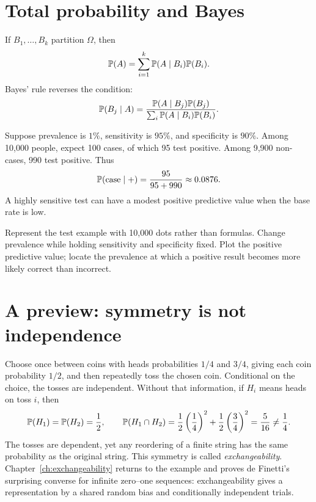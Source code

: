 \section{Total probability and Bayes}

If $B_1,\ldots,B_k$ partition $\Omega$, then
\[
\P(A)=\sum_{i=1}^k \P(A\mid B_i)\P(B_i).
\]
Bayes' rule reverses the condition:
\[
\P(B_j\mid A)=
\frac{\P(A\mid B_j)\P(B_j)}{\sum_i \P(A\mid B_i)\P(B_i)}.
\]

\begin{example}
Suppose prevalence is $1\%$, sensitivity is $95\%$, and specificity is $90\%$. Among 10,000 people, expect 100 cases, of which 95 test positive. Among 9,900 non-cases, 990 test positive. Thus
\[
\P(\text{case}\mid +)=\frac{95}{95+990}\approx 0.0876.
\]
A highly sensitive test can have a modest positive predictive value when the base rate is low.
\end{example}

\begin{labbox}
Represent the test example with 10,000 dots rather than formulas. Change prevalence while holding sensitivity and specificity fixed. Plot the positive predictive value; locate the prevalence at which a positive result becomes more likely correct than incorrect.
\end{labbox}

\section{A preview: symmetry is not independence}

Choose once between coins with heads probabilities $1/4$ and $3/4$, giving each coin probability $1/2$, and then repeatedly toss the chosen coin. Conditional on the choice, the tosses are independent. Without that information, if $H_i$ means heads on toss $i$, then
\[
\P(H_1)=\P(H_2)=\frac12,\qquad
\P(H_1\cap H_2)=\frac12\left(\frac14\right)^2
+\frac12\left(\frac34\right)^2=\frac5{16}\ne\frac14.
\]
The tosses are dependent, yet any reordering of a finite string has the same probability as the original string. This symmetry is called \emph{exchangeability}. Chapter~\ref{ch:exchangeability} returns to the example and proves de Finetti's surprising converse for infinite zero--one sequences: exchangeability gives a representation by a shared random bias and conditionally independent trials.

